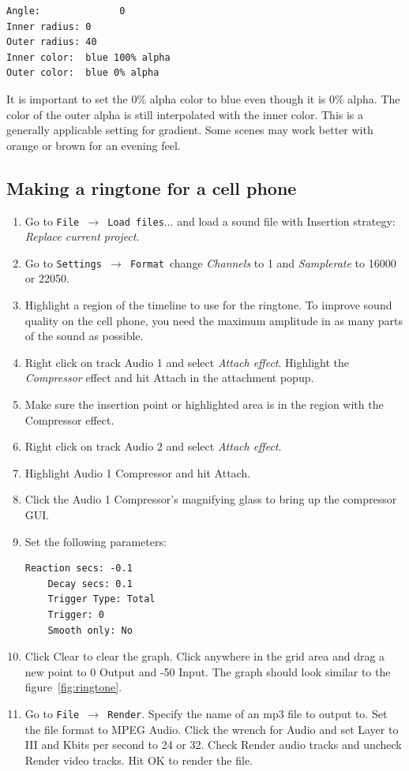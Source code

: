 \begin{lstlisting}[numbers=none]
Angle: 				0
Inner radius: 0
Outer radius: 40
Inner color:  blue 100% alpha 
Outer color:  blue 0% alpha
\end{lstlisting}

It is important to set the $0\%$ alpha color to blue even though it is $0\%$ alpha. The color of the outer alpha is still interpolated with the inner color. This is a generally applicable setting for gradient. Some scenes may work better with orange or brown for an evening feel.

\subsection{Making a ringtone for a cell phone}%
\label{sub:make_ringtone_phone}

\begin{enumerate}
	\item Go to \texttt{File $\rightarrow$ Load files$\dots$} and load a sound file with Insertion strategy: \textit{Replace current project}.
	\item Go to \texttt{Settings $\rightarrow$ Format }change \textit{Channels} to 1 and \textit{Samplerate} to 16000 or 22050.
	\item Highlight a region of the timeline to use for the ringtone. To improve sound quality on the cell
	phone, you need the maximum amplitude in as many parts of the sound as possible.
	\item Right click on track Audio 1 and select \textit{Attach effect}. Highlight the \textit{Compressor} effect and hit
	Attach in the attachment popup.
	\item Make sure the insertion point or highlighted area is in the region with the Compressor effect.
	\item Right click on track Audio 2 and select \textit{Attach effect}.
	\item Highlight Audio 1 Compressor and hit Attach.
	\item Click the Audio 1 Compressor's magnifying glass to bring up the compressor GUI.
	\item Set the following parameters:
	\begin{lstlisting}[numbers=none]
	Reaction secs: -0.1
	Decay secs: 0.1
	Trigger Type: Total
	Trigger: 0
	Smooth only: No
	\end{lstlisting}
	\item Click Clear to clear the graph. Click anywhere in the grid area and drag a new point to 0 Output
	and -50 Input. The graph should look similar to the figure~\ref{fig:ringtone}.
	\item Go to \texttt{File $\rightarrow$ Render}. Specify the name of an mp3 file to output to. Set the file format to MPEG
	Audio. Click the wrench for Audio and set Layer to III and Kbits per second to 24 or 32. Check
	Render audio tracks and uncheck Render video tracks. Hit OK to render the file.
\end{enumerate}

